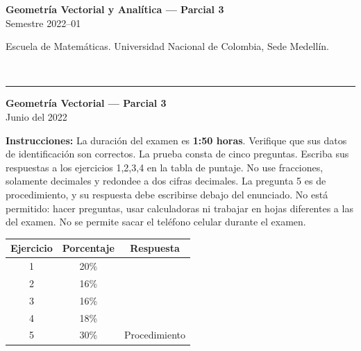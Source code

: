 \documentclass[11pt]{article}
\begin{document}
\noindent
\begin{minipage}[t]{0.6\linewidth}
{\small\bfseries Geometría Vectorial y Analítica --- Parcial 3}\\
{\small Semestre 2022--01}
\end{minipage}%
\hfill
\begin{minipage}[t]{0.35\linewidth}
\raggedleft\small Escuela de Matemáticas. Universidad Nacional de Colombia, Sede Medellín.
\end{minipage}\\[2pt]
\rule{\linewidth}{0.6pt}

\begin{center}
\textbf{Geometría Vectorial --- Parcial 3}\\
Junio del 2022
\end{center}

\textbf{Instrucciones:} La duración del examen es \textbf{1:50 horas}. Verifique que sus datos de identificación son correctos. La prueba consta de cinco preguntas. Escriba sus respuestas a los ejercicios 1,2,3,4 en la tabla de puntaje. No use fracciones, solamente decimales y redondee a dos cifras decimales. La pregunta 5 es de procedimiento, y su respuesta debe escribirse debajo del enunciado. No está permitido: hacer preguntas, usar calculadoras ni trabajar en hojas diferentes a las del examen. No se permite sacar el teléfono celular durante el examen.

\begin{center}
\begin{tabular}{|c|c|c|}
\hline
Ejercicio & Porcentaje & Respuesta\\
\hline
1 & 20\% & \\
\hline
2 & 16\% & \\
\hline
3 & 16\% & \\
\hline
4 & 18\% & \\
\hline
5 & 30\% & Procedimiento\\
\hline
\end{tabular}
\end{center}
\end{document}
